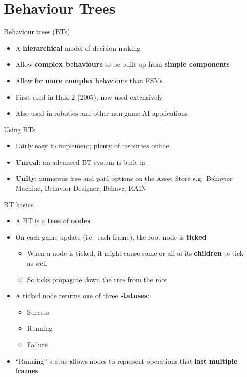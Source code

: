 \part{Behaviour Trees}
\frame{\partpage}

\begin{frame}{Behaviour trees (BTs)}
	\begin{itemize}
		\pause\item A \textbf{hierarchical} model of decision making
		\pause\item Allow \textbf{complex behaviours} to be built up from \textbf{simple components}
		\pause\item Allow for \textbf{more complex} behaviours than FSMs
		\pause\item First used in Halo 2 (2005), now used extensively
		\pause\item Also used in robotics and other non-game AI applications
	\end{itemize}
\end{frame}

\begin{frame}{Using BTs}
	\begin{itemize}
		\pause\item Fairly easy to implement; plenty of resources online
		\pause\item \textbf{Unreal}: an advanced BT system is built in
		\pause\item \textbf{Unity}: numerous free and paid options on the Asset Store
			e.g.\ Behavior Machine, Behavior Designer, Behave, RAIN
	\end{itemize}
\end{frame}

\begin{frame}{BT basics}
	\begin{itemize}
		\pause\item A BT is a \textbf{tree} of \textbf{nodes}
		\pause\item On each game update (i.e.\ each frame), the root node is \textbf{ticked}
			\begin{itemize}
				\pause\item When a node is ticked, it might cause some or all of its \textbf{children} to tick as well
				\pause\item So ticks propagate down the tree from the root
			\end{itemize}
		\pause\item A ticked node returns one of three \textbf{statuses}:
			\begin{itemize}
				\pause\item Success
				\pause\item Running
				\pause\item Failure
			\end{itemize}
		\pause\item ``Running'' status allows nodes to represent operations that \textbf{last multiple frames}
	\end{itemize}
\end{frame}

